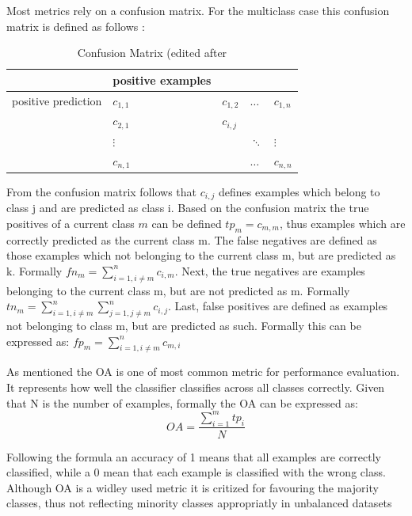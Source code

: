 \documentclass[12pt, a4paper, titlepage]{article}
\begin{document}
Most metrics rely on a confusion matrix. For the multiclass case this confusion matrix is defined as follows \citep{Kautz2017}: 
\begin{table}[hb!]
  \center
  \begin{tabular}{lllll}
  \hline
            & positive examples      &           &             &             \\ \hline
  positive prediction  & $c_{1,1}$ & $c_{1,2}$ & $\dots$     & $c_{1,n}$   \\
            & $c_{2,1}$ & $c_{i,j}$ &             &             \\
            &  $\vdots$         &           & $\ddots$ &   $\vdots$\\
            & $c_{n,1}$ &           & $\dots$     & $c_{n,n}$   \\ \hline
  \end{tabular}
  \caption{\label{tab: T1} Confusion Matrix (edited after \citep[113]{Kautz2017}}
  \end{table}

From the confusion matrix follows that $c_{i, j}$ defines examples which belong to class j and are predicted as class i. Based on the confusion matrix the true positives of a current class $m$ can be defined $tp_{m} = c_{m, m}$, thus examples which are correctly predicted as the current class m. The false negatives are defined as those examples which not belonging to the current class m, but are predicted as k. Formally $fn_{m} = \sum_{i=1, i \neq m}^n c_{i, m}$. Next, the true negatives are examples belonging to the current class m, but are not predicted as m. Formally $tn_{m} = \sum_{i=1, i\neq m}^n \sum_{j=1, j \neq m}^n c_{i,j}$. Last, false positives are defined as examples not belonging to class m, but are predicted as such. Formally this can be expressed as: $fp_{m} =  \sum_{i=1, i \neq m}^n c_{m, i}$ \citep{Kautz2017}

As mentioned the \ac{OA} is one of most common metric for performance evaluation. It represents how well the classifier classifies across all classes correctly. Given that N is the number of examples, formally the \ac{OA} can be expressed as: 
\[OA = \frac{\sum_{i=1}^m tp_i}{N} \]


Following the formula an accuracy of 1 means that all examples are correctly classified, while a 0 mean that each example is classified with the wrong class. \citep{Berthold2020}
Although \ac{OA} is a widley used metric it is critized for favouring the majority classes, thus not reflecting minority classes appropriatly in unbalanced datasets \citep{Berthold2020, Fatourechi2008}
\end{document}
